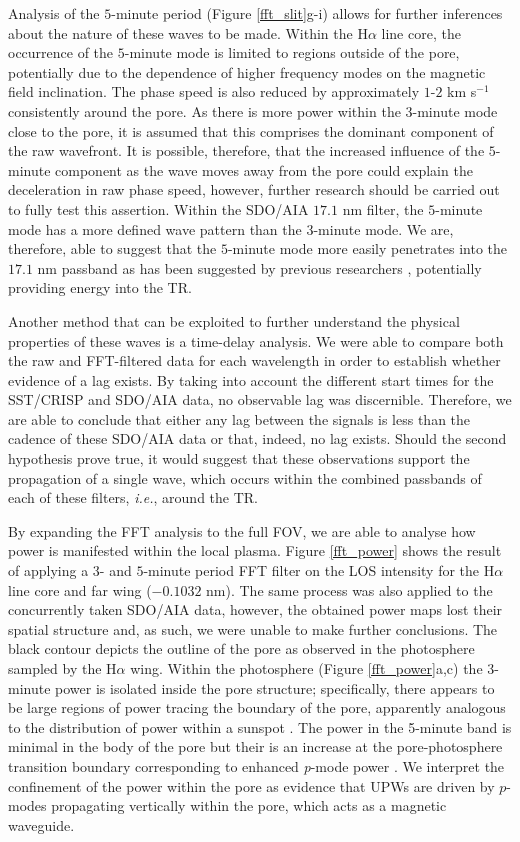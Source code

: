 	Analysis of the $5$-minute period (Figure \ref{fft_slit}g-i) allows for further inferences about the nature of these waves to be made.
	Within the H$\alpha$ line core, the occurrence of the $5$-minute mode is limited to regions outside of the pore, potentially due to the dependence of higher frequency modes on the magnetic field inclination\citep{DePontieu2004}.
	The phase speed is also reduced by approximately $1$-$2$ km s$^{-1}$ consistently around the pore.
	As there is more power within the $3$-minute mode close to the pore, it is assumed that this comprises the dominant component of the raw wavefront.
	It is possible, therefore, that the increased influence of the $5$-minute component as the wave moves away from the pore could explain the deceleration in raw phase speed, however, further research should be carried out to fully test this assertion.
	Within the SDO/AIA $17.1$ nm filter, the $5$-minute mode has a more defined wave pattern than the $3$-minute mode.
	We are, therefore, able to suggest that the $5$-minute mode more easily penetrates into the $17.1$ nm passband as has been suggested by previous researchers \citep{Moortel2002}, potentially providing energy into the TR.

	Another method that can be exploited to further understand the physical properties of these waves is a time-delay analysis.
	We were able to compare both the raw and FFT-filtered data for each wavelength in order to establish whether evidence of a lag exists.
	By taking into account the different start times for the SST/CRISP and SDO/AIA data, no observable lag was discernible.
	Therefore, we are able to conclude that either any lag between the signals is less than the cadence of these SDO/AIA data or that, indeed, no lag exists.
	Should the second hypothesis prove true, it would suggest that these observations support the propagation of a single wave, which occurs within the combined passbands of each of these filters, {\it i.e.}, around the TR.

	By expanding the FFT analysis to the full FOV, we are able to analyse how power is manifested within the local plasma.
	Figure \ref{fft_power} shows the result of applying a $3$- and $5$-minute period FFT filter on the LOS intensity for the H$\alpha$ line core and far wing ($-0.1032$ nm).
	The same process was also applied to the concurrently taken SDO/AIA data, however, the obtained power maps lost their spatial structure and, as such, we were unable to make further conclusions.
	The black contour depicts the outline of the pore as observed in the photosphere sampled by the H$\alpha$ wing.
	Within the photosphere (Figure \ref{fft_power}a,c) the 3-minute power is isolated inside the pore structure; specifically, there appears to be large regions of power tracing the boundary of the pore, apparently analogous to the distribution of power within a sunspot \citep{Stangalini2012,Reznikova2012}.
	The power in the 5-minute band is minimal in the body of the pore but their is an increase at the pore-photosphere transition boundary corresponding to enhanced \textit{p}-mode power \citep{Mathew2008}.
    We interpret the confinement of the power within the pore as evidence that UPWs are driven by $p$-modes propagating vertically within the pore, which acts as a magnetic waveguide.

